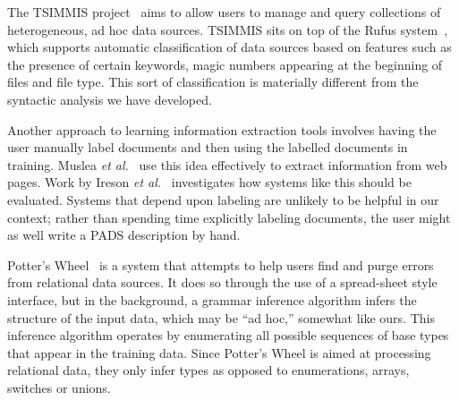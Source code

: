 The TSIMMIS project~\cite{chawathe+:tsimmis} aims to
allow users to manage and query collections of heterogeneous, ad hoc
data sources.  TSIMMIS sits on top of the Rufus
system~\cite{shoens+:rufus}, which supports automatic classification
of data sources based on features such as the presence of certain
keywords, magic numbers appearing at the beginning of files and file
type.  
This sort of classification is materially
different from the syntactic analysis we have developed.

Another approach to learning information extraction tools involves
having the user manually label documents and then using the labelled
documents in training.  Muslea {\em et al.}~\cite{muslea+:active-learning} 
use this idea effectively to extract information from web pages.  Work by 
Ireson {\em et al.}~\cite{ireson+:ml-evaluation} investigates how systems 
like this should be evaluated.  Systems that depend upon labeling
are unlikely to be helpful in our context; rather than spending 
time explicitly labeling documents, the user might as well write a 
PADS description by hand.



Potter's Wheel~\cite{raman+:potterwheel} is a system that attempts to
help users find and purge errors from
relational data sources.  It does so through the use of a spread-sheet
style interface, but in the background, a grammar inference algorithm
infers the structure of the input data, which may be ``ad hoc,'' 
somewhat like ours.  This inference algorithm operates by
enumerating all possible sequences of base types that appear
in the training data.  
Since Potter's Wheel is aimed at processing
relational data, they only infer  types
as opposed to enumerations, arrays, switches or unions.  

